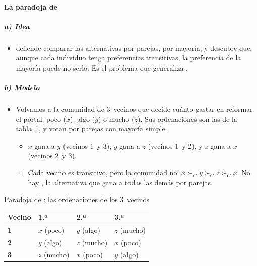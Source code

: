 \documentclass[11pt]{article}
\begin{document}
\paragraph{La paradoja de }

\subparagraph{a) Idea}

\begin{itemize}
\item \textcite{Condorcet1785Essai} defiende comparar las alternativas por parejas, por mayoría, y descubre que, aunque cada individuo tenga preferencias transitivas, la preferencia de la mayoría puede no serlo. Es el problema que generaliza .
\end{itemize}

\subparagraph{b) Modelo}

\begin{itemize}
\item Volvamos a la comunidad de 3~vecinos que decide cuánto gastar en reformar el portal: poco ($x$), algo ($y$) o mucho ($z$). Sus ordenaciones son las de la tabla~\ref{tab:condorcet}, y votan por parejas con mayoría simple.
  \begin{itemize}
  \item $x$ gana a $y$ (vecinos 1~y 3); $y$ gana a $z$ (vecinos 1~y 2), y $z$ gana a $x$ (vecinos 2~y 3).
  \item Cada vecino es transitivo, pero la comunidad no: $x\succ_Gy\succ_Gz\succ_Gx$. No hay , la alternativa que gana a todas las demás por parejas.
  \end{itemize}
\end{itemize}

\begin{table}[H]
\centering
\caption{Paradoja de : las ordenaciones de los 3~vecinos}\label{tab:condorcet}
\renewcommand{\arraystretch}{1.25}
\begin{tabular}{>{\centering\arraybackslash}m{2.4cm}>{\centering\arraybackslash}m{2.4cm}>{\centering\arraybackslash}m{2.4cm}>{\centering\arraybackslash}m{2.4cm}}
\toprule
\rowcolor{tceeazulpalido}\textbf{Vecino} & \textbf{1.ª} & \textbf{2.ª} & \textbf{3.ª}\\
\midrule
\textcolor{tceemorado}{\textbf{1}} & $x$ (poco) & $y$ (algo) & $z$ (mucho)\\
\textcolor{tceemorado}{\textbf{2}} & $y$ (algo) & $z$ (mucho) & $x$ (poco)\\
\textcolor{tceemorado}{\textbf{3}} & $z$ (mucho) & $x$ (poco) & $y$ (algo)\\
\bottomrule
\end{tabular}
\end{table}
\end{document}
